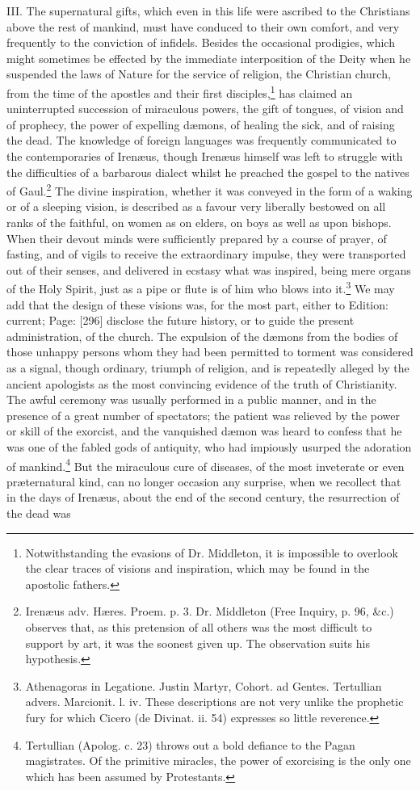 III. The supernatural gifts, which even in this life were ascribed to the Christians above the rest of mankind, must have conduced to their own comfort, and very frequently to the conviction of infidels. Besides the occasional prodigies, which might sometimes be effected by the immediate interposition of the Deity when he suspended the laws of Nature for the service of religion, the Christian church, from the time of the apostles and their first disciples,\footnote{Notwithstanding the evasions of Dr. Middleton, it is impossible to overlook the clear traces of visions and inspiration, which may be found in the apostolic fathers.} has claimed an uninterrupted succession of miraculous powers, the gift of tongues, of vision and of prophecy, the power of expelling dæmons, of healing the sick, and of raising the dead. The knowledge of foreign languages was frequently communicated to the contemporaries of Irenæus, though Irenæus himself was left to struggle with the difficulties of a barbarous dialect whilst he preached the gospel to the natives of Gaul.\footnote{Irenæus adv. Hæres. Proem. p. 3. Dr. Middleton (Free Inquiry, p. 96, \&c.) observes that, as this pretension of all others was the most difficult to support by art, it was the soonest given up. The observation suits his hypothesis.} The divine inspiration, whether it was conveyed in the form of a waking or of a sleeping vision, is described as a favour very liberally bestowed on all ranks of the faithful, on women as on elders, on boys as well as upon bishops. When their devout minds were sufficiently prepared by a course of prayer, of fasting, and of vigils to receive the extraordinary impulse, they were transported out of their senses, and delivered in ecstasy what was inspired, being mere organs of the Holy Spirit, just as a pipe or flute is of him who blows into it.\footnote{Athenagoras in Legatione. Justin Martyr, Cohort. ad Gentes. Tertullian advers. Marcionit. l. iv. These descriptions are not very unlike the prophetic fury for which Cicero (de Divinat. ii. 54) expresses so little reverence.} We may add that the design of these visions was, for the most part, either to Edition: current; Page: [296] disclose the future history, or to guide the present administration, of the church. The expulsion of the dæmons from the bodies of those unhappy persons whom they had been permitted to torment was considered as a signal, though ordinary, triumph of religion, and is repeatedly alleged by the ancient apologists as the most convincing evidence of the truth of Christianity. The awful ceremony was usually performed in a public manner, and in the presence of a great number of spectators; the patient was relieved by the power or skill of the exorcist, and the vanquished dæmon was heard to confess that he was one of the fabled gods of antiquity, who had impiously usurped the adoration of mankind.\footnote{Tertullian (Apolog. c. 23) throws out a bold defiance to the Pagan magistrates. Of the primitive miracles, the power of exorcising is the only one which has been assumed by Protestants.} But the miraculous cure of diseases, of the most inveterate or even præternatural kind, can no longer occasion any surprise, when we recollect that in the days of Irenæus, about the end of the second century, the resurrection of the dead was 